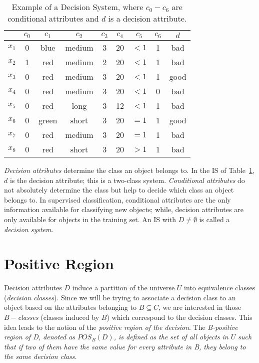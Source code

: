 \documentclass[letterpaper, twoside, openright, 12pt]{book}%
\begin{document}
	 \begin{table}[htb]
			\caption{Example of a Decision System, where $c_0-c_6$ are conditional attributes and $d$ is a decision attribute.} \label{tab_IS}
			\centering
	 	\begin{tabular}{ccccccccc}\\
			 \hline
	 			  & $c_0$ & $c_1$ & $c_2$ &  $c_3$ & $c_4$ & $c_5$ &  $c_6$ & $d$ \\ 
		 	\hline
			$x_1$ & 0 & blue  & medium & 3 & 20 & $<1$  & 1 & bad   \\
			$x_2$ & 1 & red   & medium & 2 & 20 & $<1$  & 1 & bad   \\
			$x_3$ & 0 & red   & medium & 3 & 20 & $<1$  & 1 & good   \\
			$x_4$ & 0 & red   & medium & 3 & 20 & $<1$  & 0 & bad   \\
			$x_5$ & 0 & red   & long   & 3 & 12 & $<1$  & 1 & bad   \\
			$x_6$ & 0 & green & short  & 3 & 20 & $=1$  & 1 & good   \\
			$x_7$ & 0 & red   & medium & 3 & 20 & $=1$  & 1 & bad   \\
			$x_8$ & 0 & red   & short  & 3 & 20 & $>1$  & 1 & bad   \\
			\hline
	 	\end{tabular}             
	 \end{table}
	 
	  \textit{Decision attributes} determine the class an object belongs to. In the IS of Table~\ref{tab_IS}, $d$ is the decision attribute; this is a two-class system. \textit{Conditional attributes} do not absolutely determine the class but help to decide which class an object belongs to. In supervised classification, conditional attributes are the only information available for classifying new objects; while, decision attributes are only available for objects in the training set. An IS with $D \neq \emptyset$ is called a \textit{decision system}.
	  
	\section{Positive Region}\label{subsect_Pos}
	  Decision attributes $D$ induce a partition of the universe $U$ into equivalence classes (\textit{decision classes}). Since we will be trying to associate a decision class to an object based on the attributes belonging to $B \subseteq C$, we are interested in those $B-$\textit{classes} (classes induced by $B$) which correspond to the decision classes. This idea leads to the notion of the  \textit{positive region of the decision}. The \textit{B-positive region of D, denoted as $POS_B(D)$, is defined as the set of all objects in $U$ such that if two of them have the same value for every attribute in B, they belong to the same decision class.}
	 
\end{document}
